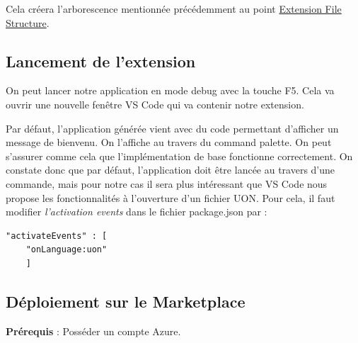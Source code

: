 \documentclass[
    iict, %
    il, %
]{heig-tb}
\begin{document}
Cela créera l'arborescence mentionnée précédemment au point \hyperref[Extension File Structure]{Extension File Structure}.

\subsection{Lancement de l'extension}
On peut lancer notre application en mode debug avec la touche F5. Cela va ouvrir une nouvelle fenêtre VS Code qui va contenir notre extension.

Par défaut, l'application générée vient avec du code permettant d'afficher un message de bienvenu. On l'affiche au travers du command palette. On peut s'assurer comme cela que l'implémentation de base fonctionne correctement.
On constate donc que par défaut, l'application doit être lancée au travers d'une commande, mais pour notre cas il sera plus intéressant que VS Code nous propose les fonctionnalités à l'ouverture d'un fichier UON.
Pour cela, il faut modifier \emph{l'activation events} dans le fichier package.json par :
\begin{lstlisting}[frame=single]
    "activateEvents" : [
	"onLanguage:uon"
    ]
\end{lstlisting}

\subsection{Déploiement sur le Marketplace}




\textbf{Prérequis} : Posséder un compte Azure.
\end{document}
